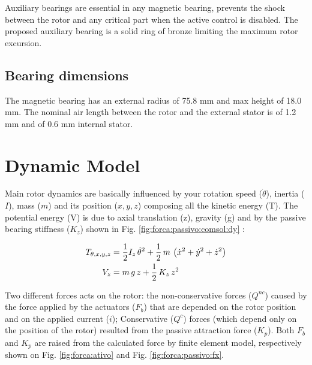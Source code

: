 \documentclass[10pt,fleqn,a4paper,twoside]{article}
\begin{document}
	Auxiliary bearings are essential in any magnetic bearing, prevents the shock between the rotor and any critical part when the active control is disabled. The proposed auxiliary bearing is a solid ring of bronze limiting the maximum rotor excursion.
	
	\subsection{Bearing dimensions}
	
	The magnetic bearing has an external radius of 75.8 mm and max height of 18.0 mm. The nominal air length between the rotor and the external stator is of 1.2 mm and of 0.6 mm internal stator. 
	
	\section{Dynamic Model}
	
	
	
	Main rotor dynamics are basically influenced by your rotation speed ($\dot{\theta}$), inertia ($I$), mass ($m$) and its position ($x,y,z$) composing all the kinetic energy (T). The potential energy (V) is due to axial translation (z), gravity (g) and by the passive bearing stiffness ($K_z$) shown in Fig. \ref{fig:forca:passivo:comsol:dy} : 
	
	\begin{align}
		T_{\theta, x, y, z} &= \frac{1}{2} I_z \, \dot{\theta}^2 + \frac{1}{2} \, m \, \left( \dot{x}^2 + \dot{y}^2 + \dot{z}^2 \right) \notag \\
		V_z &= m \, g \, z + \frac{1}{2} \, K_z \, z^2
	\end{align}	

	Two different forces acts on the rotor: the  non-conservative forces ($Q^{nc}$) caused by the force applied by the actuators ($F_b$) that are depended on the rotor position and on the applied current ($i$); Conservative ($Q^{c}$) forces (which depend only on the position of the rotor) resulted from the passive attraction force ($K_p$). Both $F_b$ and $K_p$ are raised from the calculated force by finite element model, respectively shown on Fig. \ref{fig:forca:ativo} and Fig. \ref{fig:forca:passivo:fx}.
\end{document}
